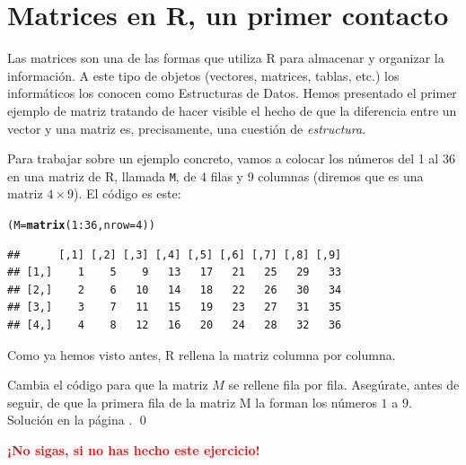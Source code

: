 \documentclass[10pt,a4paper]{article}\usepackage[]{graphicx}\usepackage[]{color}
\makeatletter
\newcommand{\hlnum}[1]{\textcolor[rgb]{0.686,0.059,0.569}{#1}}%
\newcommand{\hlopt}[1]{\textcolor[rgb]{0,0,0}{#1}}%
\newcommand{\hlstd}[1]{\textcolor[rgb]{0.345,0.345,0.345}{#1}}%
\newcommand{\hlkwb}[1]{\textcolor[rgb]{0.69,0.353,0.396}{#1}}%
\newcommand{\hlkwc}[1]{\textcolor[rgb]{0.333,0.667,0.333}{#1}}%
\newcommand{\hlkwd}[1]{\textcolor[rgb]{0.737,0.353,0.396}{\textbf{#1}}}%
\newenvironment{kframe}{%
 \def\at@end@of@kframe{}%
 \ifinner\ifhmode%
  \def\at@end@of@kframe{\end{minipage}}%
  \begin{minipage}{\columnwidth}%
 \fi\fi%
 \def\FrameCommand##1{\hskip\@totalleftmargin \hskip-\fboxsep
 \colorbox{shadecolor}{##1}\hskip-\fboxsep
     \hskip-\linewidth \hskip-\@totalleftmargin \hskip\columnwidth}%
 \MakeFramed {\advance\hsize-\width
   \@totalleftmargin\z@ \linewidth\hsize
   \@setminipage}}%
 {\par\unskip\endMakeFramed%
 \at@end@of@kframe}
\newenvironment{knitrout}{}{} %
\newcounter {cont01}
\makeatother
\begin{document}
\section{Matrices en R, un primer contacto}
\label{tut03:subsec:MatricesR}

Las matrices son una de las formas que utiliza R para almacenar y organizar la información. A este tipo de objetos (vectores, matrices, tablas, etc.) los informáticos los conocen como Estructuras de Datos. Hemos presentado el primer ejemplo de matriz tratando de hacer visible el hecho de que la diferencia entre un vector y una matriz es, precisamente, una cuestión de {\em estructura}.

Para trabajar sobre un ejemplo concreto, vamos a colocar los números del 1 al 36 en una matriz de R, llamada {\tt M}, de 4 filas y 9 columnas (diremos que es una matriz $4\times 9$). El código es este:
\begin{knitrout}
\color{fgcolor}\begin{kframe}
\begin{alltt}
\hlstd{(M} \hlkwb{=} \hlkwd{matrix}\hlstd{(}\hlnum{1}\hlopt{:}\hlnum{36}\hlstd{,} \hlkwc{nrow}\hlstd{=}\hlnum{4}\hlstd{) )}
\end{alltt}
\begin{verbatim}
##      [,1] [,2] [,3] [,4] [,5] [,6] [,7] [,8] [,9]
## [1,]    1    5    9   13   17   21   25   29   33
## [2,]    2    6   10   14   18   22   26   30   34
## [3,]    3    7   11   15   19   23   27   31   35
## [4,]    4    8   12   16   20   24   28   32   36
\end{verbatim}
\end{kframe}
\end{knitrout}
     Como ya hemos visto antes, R rellena la matriz columna por columna.

\begin{ejercicio}
\label{tut03:ejercicio03}
\quad
Cambia el código para que la matriz $M$ se rellene fila por fila. Asegúrate, antes de seguir, de que la primera fila de la matriz M la forman los números $1$ a $9$. Solución en la página \pageref{tut03:ejercicio03:sol}.
\qed
\end{ejercicio}

     \begin{center}
\textcolor{red}{\Large\bf  ¡No sigas, si no has hecho este ejercicio!}
\end{center}
\newpage
\end{document}
